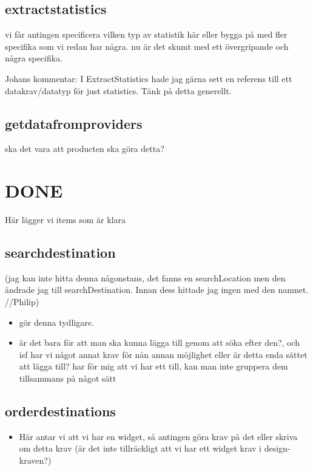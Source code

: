 \documentclass[a4paper]{article}
\begin{document}
		
	\subsection{extractstatistics}
vi får antingen specificera vilken typ av statistik  här eller bygga på med  fler specifika som vi redan har några. nu är det skumt med ett övergripande och några specifika.
	
	Johans kommentar: I ExtractStatistics hade jag gärna sett en referens till ett datakrav/datatyp för just statistics. Tänk på detta generellt.


	\subsection{getdatafromproviders}
	ska det vara att producten ska göra detta?
	



	
\section{DONE}
Här lägger vi items som är klara

	\subsection{searchdestination} (jag kan inte hitta denna någonstans, det fanns en searchLocation men den ändrade jag till searchDestination. Innan dess hittade jag ingen med den namnet. //Philip)
		\begin{itemize}
			\item gör denna tydligare. 
			\item är det bara för att man ska kunna lägga till genom att söka efter den?, och isf har vi något annat krav för nån annan möjlighet eller är detta enda sättet att lägga till? har för mig att vi har ett till, kan man inte gruppera dem tillsammans på något sätt
		\end{itemize}

\subsection{orderdestinations}
		\begin{itemize}
			\item Här antar vi att vi har en widget, så antingen göra krav på det eller skriva om detta krav (är det inte tillräckligt att vi har ett widget krav i design-kraven?)
		\end{itemize}
\end{document}
